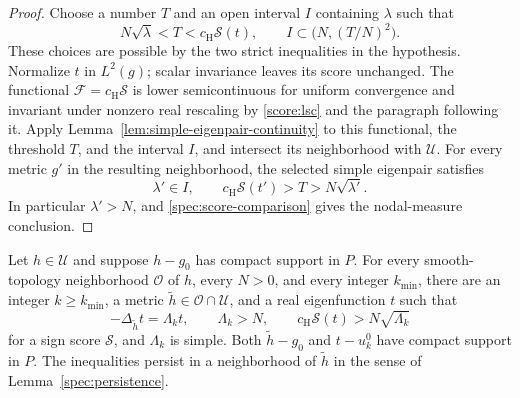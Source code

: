 \begin{proof}
Choose a number $T$ and an open interval $I$ containing $\lambda$ such that
\[
 N\sqrt\lambda<T<c_{\mathrm H}\mathcal S(t),
 \qquad I\subset\bigl(N,(T/N)^2\bigr).
\]
These choices are possible by the two strict inequalities in the
hypothesis. Normalize $t$ in $L^2(g)$; scalar invariance leaves its
score unchanged. The functional
$\mathcal F=c_{\mathrm H}\mathcal S$ is lower semicontinuous for
uniform convergence and invariant under nonzero real rescaling by
\eqref{score:lsc} and the paragraph following it.
Apply Lemma~\ref{lem:simple-eigenpair-continuity} to this functional,
the threshold $T$, and the interval $I$, and intersect its neighborhood
with $\mathcal U$. For every metric $g'$ in the resulting neighborhood,
the selected simple eigenpair satisfies
\[
 \lambda'\in I,\qquad c_{\mathrm H}\mathcal S(t')>T
                         >N\sqrt{\lambda'}.
\]
In particular $\lambda'>N$, and
\eqref{spec:score-comparison} gives the nodal-measure conclusion.
\end{proof}

\begin{proposition}
\label{spec:one-step}
Let $h\in\mathcal U$ and suppose $h-g_0$ has compact support in $P$.
For every smooth-topology neighborhood $\mathcal O$ of $h$, every
$N>0$, and every integer $k_{\min}$, there are an integer $k\ge k_{\min}$, a metric
$\widetilde h\in\mathcal O\cap\mathcal U$, and a real eigenfunction
$t$ such that
\[
 -\Delta_{\widetilde h}t=\Lambda_k t,\qquad
 \Lambda_k>N,\qquad c_{\mathrm H}\mathcal S(t)>N\sqrt{\Lambda_k}
\]
for a sign score $\mathcal S$, and $\Lambda_k$ is simple.
Both $\widetilde h-g_0$ and $t-u_k^0$ have compact support in $P$.
The inequalities persist in a neighborhood of $\widetilde h$ in the
sense of Lemma~\ref{spec:persistence}.
\end{proposition}

